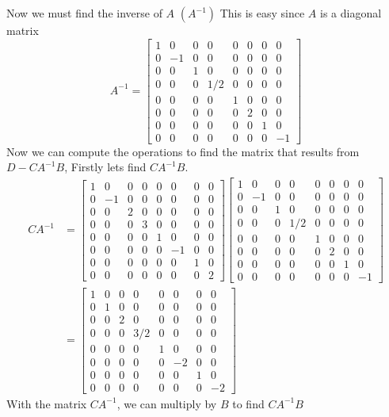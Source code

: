 \documentclass{report}
\begin{document}
Now we must find the inverse of $A$ $(A^{-1})$ This is easy since $A$ is a diagonal matrix
$$
A^{-1} = \begin{bmatrix}
1&0&0&0&0&0&0&0\\
0&-1&0&0&0&0&0&0\\
0&0&1&0&0&0&0&0\\
0&0&0&1/2&0&0&0&0\\
0&0&0&0&1&0&0&0\\
0&0&0&0&0&2&0&0\\
0&0&0&0&0&0&1&0\\
0&0&0&0&0&0&0&-1
\end{bmatrix}
$$
Now we can compute the operations to find the matrix that results from $D - CA^{-1}B$,  Firstly lets find $CA^{-1}B.$
$$
\begin{aligned}
CA^{-1} & = 
\begin{bmatrix}
1&0&0&0&0&0&0&0 \\
0&-1&0&0&0&0&0&0 \\
0&0&2&0&0&0&0&0 \\
0&0&0&3&0&0&0&0 \\
0&0&0&0&1&0&0&0 \\
0&0&0&0&0&-1&0&0 \\
0&0&0&0&0&0&1&0 \\
0&0&0&0&0&0&0&2
\end{bmatrix}
\begin{bmatrix}
1&0&0&0&0&0&0&0\\
0&-1&0&0&0&0&0&0\\
0&0&1&0&0&0&0&0\\
0&0&0&1/2&0&0&0&0\\
0&0&0&0&1&0&0&0\\
0&0&0&0&0&2&0&0\\
0&0&0&0&0&0&1&0\\
0&0&0&0&0&0&0&-1
\end{bmatrix} \\
& = \begin{bmatrix}
1&0&0&0&0&0&0&0\\
0&1&0&0&0&0&0&0\\
0&0&2&0&0&0&0&0\\
0&0&0&3/2&0&0&0&0\\
0&0&0&0&1&0&0&0\\
0&0&0&0&0&-2&0&0\\
0&0&0&0&0&0&1&0\\
0&0&0&0&0&0&0&-2
\end{bmatrix}
\end{aligned}
$$
With the matrix $CA^{-1}$,  we can multiply by $B$ to find $CA^{-1}B$
\end{document}
